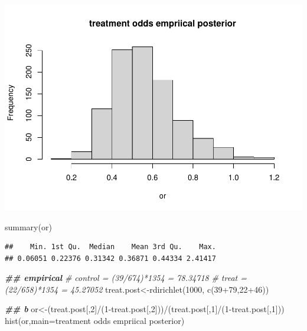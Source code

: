 \documentclass[
]{book}
\newenvironment{Shaded}{\begin{snugshade}}{\end{snugshade}}
\newcommand{\AttributeTok}[1]{\textcolor[rgb]{0.77,0.63,0.00}{#1}}
\newcommand{\CommentTok}[1]{\textcolor[rgb]{0.56,0.35,0.01}{\textit{#1}}}
\newcommand{\DecValTok}[1]{\textcolor[rgb]{0.00,0.00,0.81}{#1}}
\newcommand{\DocumentationTok}[1]{\textcolor[rgb]{0.56,0.35,0.01}{\textbf{\textit{#1}}}}
\newcommand{\FunctionTok}[1]{\textcolor[rgb]{0.00,0.00,0.00}{#1}}
\newcommand{\NormalTok}[1]{#1}
\newcommand{\OtherTok}[1]{\textcolor[rgb]{0.56,0.35,0.01}{#1}}
\newcommand{\SpecialCharTok}[1]{\textcolor[rgb]{0.00,0.00,0.00}{#1}}
\newcommand{\StringTok}[1]{\textcolor[rgb]{0.31,0.60,0.02}{#1}}
\theoremstyle{definition}
\theoremstyle{definition}
\theoremstyle{definition}
\theoremstyle{definition}
\theoremstyle{remark}
\begin{document}
\includegraphics{_main_files/figure-latex/unnamed-chunk-35-1.pdf}

\begin{Shaded}
\begin{Highlighting}[]
  \FunctionTok{summary}\NormalTok{(or)}
\end{Highlighting}
\end{Shaded}

\begin{verbatim}
##    Min. 1st Qu.  Median    Mean 3rd Qu.    Max. 
## 0.06051 0.22376 0.31342 0.36871 0.44334 2.41417
\end{verbatim}

\begin{Shaded}
\begin{Highlighting}[]
  \DocumentationTok{\#\# empirical}
  \CommentTok{\# control = (39/674)*1354 = 78.34718}
  \CommentTok{\# treat = (22/658)*1354 = 45.27052}
\NormalTok{  treat.post}\OtherTok{\textless{}{-}}\FunctionTok{rdirichlet}\NormalTok{(}\DecValTok{1000}\NormalTok{, }\FunctionTok{c}\NormalTok{(}\DecValTok{39}\SpecialCharTok{+}\DecValTok{79}\NormalTok{,}\DecValTok{22}\SpecialCharTok{+}\DecValTok{46}\NormalTok{))}
 
  
  \DocumentationTok{\#\# b}
\NormalTok{  or}\OtherTok{\textless{}{-}}\NormalTok{(treat.post[,}\DecValTok{2}\NormalTok{]}\SpecialCharTok{/}\NormalTok{(}\DecValTok{1}\SpecialCharTok{{-}}\NormalTok{treat.post[,}\DecValTok{2}\NormalTok{]))}\SpecialCharTok{/}\NormalTok{(treat.post[,}\DecValTok{1}\NormalTok{]}\SpecialCharTok{/}\NormalTok{(}\DecValTok{1}\SpecialCharTok{{-}}\NormalTok{treat.post[,}\DecValTok{1}\NormalTok{]))}
  \FunctionTok{hist}\NormalTok{(or,}\AttributeTok{main=}\StringTok{\textquotesingle{}treatment odds empriical posterior\textquotesingle{}}\NormalTok{)}
\end{Highlighting}
\end{Shaded}
\end{document}
